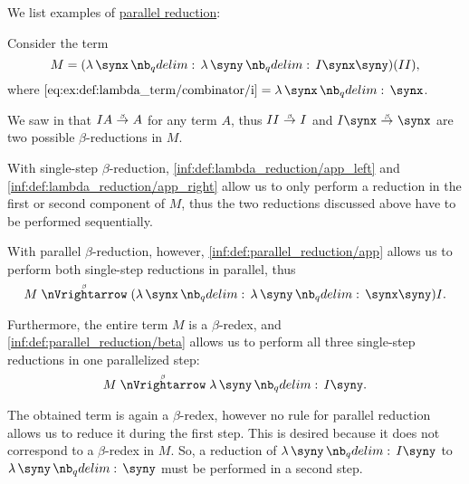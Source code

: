 \begin{example}\label{ex:def:parallel_reduction}
  We list examples of \hyperref[def:parallel_reduction]{parallel reduction}:
  \begin{thmenum}
     Consider the term
    \begin{equation*}
      M = (\qabs \synx \qabs \syny I \synx \syny)(I I),
    \end{equation*}
    where \( \ref{eq:ex:def:lambda_term/combinator/i} = \qabs \synx \synx \).

    We saw in  that \( I A \bred A \) for any term \( A \), thus \( I I \bred I \) and \( I \synx \bred \synx \) are two possible \( \beta \)-reductions in \( M \).

    With single-step \( \beta \)-reduction, \ref{inf:def:lambda_reduction/app_left} and \ref{inf:def:lambda_reduction/app_right} allow us to only perform a reduction in the first or second component of \( M \), thus the two reductions discussed above have to be performed sequentially.

    With parallel \( \beta \)-reduction, however, \ref{inf:def:parallel_reduction/app} allows us to perform both single-step reductions in parallel, thus
    \begin{equation*}
      M \pbred (\qabs \synx \qabs \syny \synx \syny) I.
    \end{equation*}

    Furthermore, the entire term \( M \) is a \( \beta \)-redex, and \ref{inf:def:parallel_reduction/beta} allows us to perform all three single-step reductions in one parallelized step:
    \begin{equation*}
      M \pbred \qabs \syny I \syny.
    \end{equation*}

    The obtained term is again a \( \beta \)-redex, however no rule for parallel reduction allows us to reduce it during the first step. This is desired because it does not correspond to a \( \beta \)-redex in \( M \). So, a reduction of \( \qabs \syny I \syny \) to \( \qabs \syny \syny \) must be performed in a second step.
  \end{thmenum}
\end{example}

